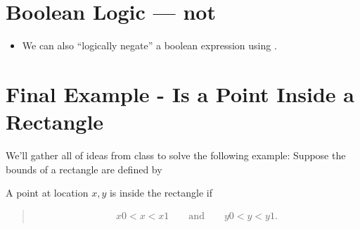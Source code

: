 \documentclass[letterpaper,10pt,english]{sphinxmanual}
\begin{document}
\section{Boolean Logic — not}
\label{\detokenize{lecture_notes/lec06_conditionals1:boolean-logic-not}}\begin{itemize}
\item {} 
We can also “logically negate” a boolean expression using .

%
\begin{sphinxVerbatim}[commandchars=\\\{\}]
  
  
  
\end{sphinxVerbatim}

\end{itemize}


\section{Final Example - Is a Point Inside a Rectangle}
\label{\detokenize{lecture_notes/lec06_conditionals1:final-example-is-a-point-inside-a-rectangle}}
We’ll gather all of ideas from class to solve the following example:
Suppose the bounds of a rectangle are defined by
\begin{quote}

%
\begin{sphinxVerbatim}[commandchars=\\\{\}]
  
  
  
  
\end{sphinxVerbatim}
\end{quote}

A point at location \(x,y\) is inside the rectangle if
\begin{quote}
\begin{equation*}
\begin{split}x0 < x < x1 \qquad \text{and} \qquad y0 < y < y1.\end{split}
\end{equation*}\end{quote}
\end{document}

